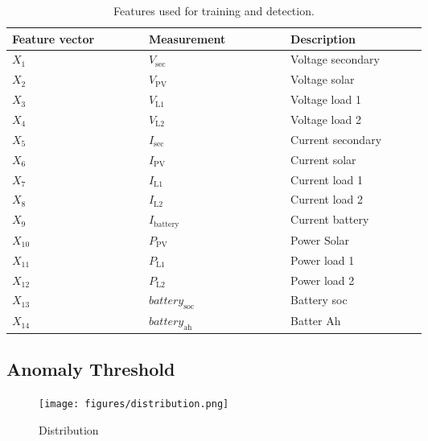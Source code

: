 \begin{table}[htbp!] 
\centering
\caption{Features used for training and detection.}
\begin{tabular}{| p{0.2\linewidth} | p{0.2\linewidth} | p{0.2\linewidth} |}
\hline
\textbf{Feature vector} & \textbf{Measurement} & \textbf{Description}
\\ \hline
$X_1$ & $V_{\text{sec}}$ & Voltage secondary
\\ \hline
$X_2$ & $V_{\text{PV}}$ & Voltage solar
\\ \hline
$X_3$ & $V_{\text{L1}}$ & Voltage load 1
\\ \hline
$X_4$ & $V_{\text{L2}}$ & Voltage load 2
\\ \hline
$X_5$ & $I_{\text{sec}}$ & Current secondary
\\ \hline
$X_6$ & $I_{\text{PV}}$ & Current solar
\\ \hline
$X_7$ & $I_{\text{L1}}$ & Current load 1
\\ \hline
$X_8$ & $I_{\text{L2}}$ & Current load 2
\\ \hline
$X_9$ & $I_{\text{battery}}$ & Current battery
\\ \hline
$X_{\text{10}}$ & $P_{\text{PV}}$ & Power Solar
\\ \hline
$X_{\text{11}}$ & $P_{\text{L1}}$ & Power load 1
\\ \hline
$X_{\text{12}}$ & $P_{\text{L2}}$ & Power load 2
\\ \hline
$X_{\text{13}}$ & $battery_{\text{soc}}$ & Battery soc
\\ \hline
$X_{\text{14}}$ & $battery_{\text{ah}}$ & Batter Ah
\\ \hline

\end{tabular}
\centering
\label{tab:data}
\end{table}


\subsection{Anomaly Threshold}




\begin{figure}[htbp!] 
    \centering 
    \texttt{[image: figures/distribution.png]}
    \caption{Distribution}
    \centering
    \label{fig:training2}
\end{figure}

